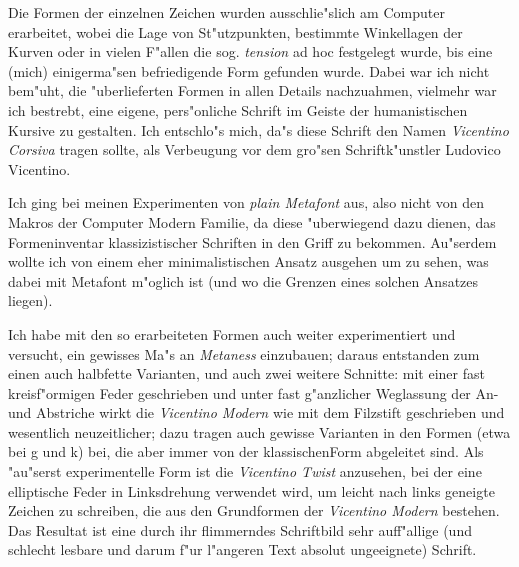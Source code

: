 \documentclass[draft,12pt,a4paper,german]{article}
\newcommand{\MF}{Metafont}
\begin{document}
Die Formen der einzelnen Zeichen wurden ausschlie"slich am Computer
erarbeitet, wobei die Lage von St"utzpunkten, bestimmte Winkellagen der
Kurven oder in vielen F"allen die sog. \emph{tension} ad hoc festgelegt wurde,
bis eine (mich) einigerma"sen befriedigende Form gefunden wurde. Dabei war
ich nicht bem"uht, die "uberlieferten Formen in allen Details nachzuahmen,
vielmehr war ich bestrebt, eine eigene, pers"onliche Schrift im Geiste der
humanistischen Kursive zu gestalten. Ich entschlo"s mich, da"s diese Schrift
den Namen \emph{Vicentino Corsiva} tragen sollte, als Verbeugung vor dem gro"sen
Schriftk"unstler Ludovico Vicentino.

Ich ging bei meinen Experimenten von \emph{plain \MF{}} aus, also nicht
von den Makros der Computer Modern Familie, da diese "uberwiegend dazu
dienen, das Formeninventar klassizistischer Schriften in den Griff zu
bekommen. Au"serdem wollte ich von einem eher minimalistischen Ansatz
ausgehen um zu sehen, was dabei mit \MF{} m"oglich ist (und wo die Grenzen
eines solchen Ansatzes liegen).  

Ich habe mit den so erarbeiteten Formen auch weiter experimentiert und
versucht, ein gewisses Ma"s an \emph{Metaness} einzubauen; daraus entstanden
zum einen auch halbfette Varianten, und auch zwei weitere
\glqq Schnitte\grqq : mit
einer fast kreisf"ormigen Feder geschrieben und unter fast g"anzlicher
Weglassung der An- und Abstriche wirkt die \emph{Vicentino Modern} wie mit
dem Filzstift geschrieben und wesentlich neuzeitlicher; dazu tragen auch
gewisse Varianten in den Formen (etwa bei g und k) bei, die aber immer von
der \glqq klassischen\grqq  Form abgeleitet sind. Als "au"serst experimentelle
Form ist
die \emph{Vicentino Twist} anzusehen, bei der eine elliptische Feder in
Linksdrehung verwendet wird, um leicht nach links geneigte Zeichen zu
schreiben, die aus den Grundformen der \emph{Vicentino Modern} bestehen. Das
Resultat ist eine durch ihr flimmerndes Schriftbild sehr auff"allige (und
schlecht lesbare und darum f"ur l"angeren Text absolut ungeeignete) Schrift.
\end{document}
